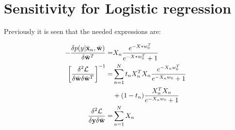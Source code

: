 \section{Sensitivity for Logistic regression}

Previously it is seen that the needed expressions are:

\begin{align*}
- \frac{\delta p(y|\bar{{\bf x}}_n,\bar{{\bf w}})}{\delta \bar{{\bf w}}^T}=&
X_n\frac{e^{-X*w_0^T}}{e^{-X*w_0^T}+1}\\
 \left[ \frac{\delta^2 \mathcal{L}}{\delta \bar{{\bf w}} \delta \bar{{\bf w}}^T} \right]^{-1}=&
 \sum_{n=1}^{N}  t_n X_n^T X_n \frac{e^{-X_n w_0^T}}{e^{-X_nw_0}+1}\\&+(1-t_n) \frac{X_n^T X_n}{e^{-X_nw_0}+1}\\
 \frac{\delta^2 \mathcal{L}}{\delta {\bf y} \delta \bar{{\bf w}}}=& \sum_{n=1}^{N} X_n
\end{align*}



